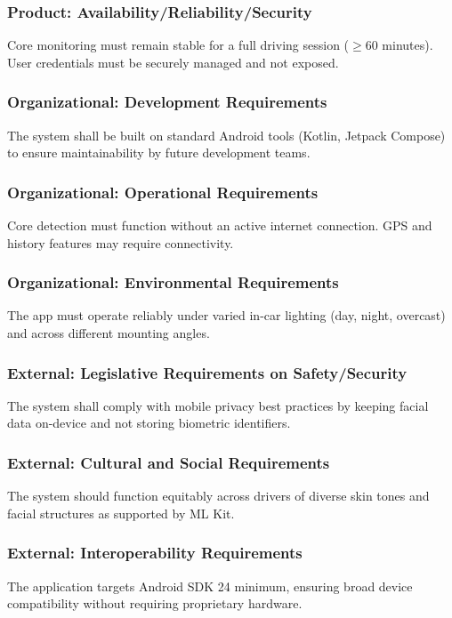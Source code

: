 \documentclass[11pt]{report}
\begin{document}
\subsubsection{Product: Availability/Reliability/Security}
Core monitoring must remain stable for a full driving session ($\geq$60 minutes). User credentials must be securely managed and not exposed.

\subsubsection{Organizational: Development Requirements}
The system shall be built on standard Android tools (Kotlin, Jetpack Compose) to ensure maintainability by future development teams.

\subsubsection{Organizational: Operational Requirements}
Core detection must function without an active internet connection. GPS and history features may require connectivity.

\subsubsection{Organizational: Environmental Requirements}
The app must operate reliably under varied in-car lighting (day, night, overcast) and across different mounting angles.

\subsubsection{External: Legislative Requirements on Safety/Security}
The system shall comply with mobile privacy best practices by keeping facial data on-device and not storing biometric identifiers.

\subsubsection{External: Cultural and Social Requirements}
The system should function equitably across drivers of diverse skin tones and facial structures as supported by ML Kit.

\subsubsection{External: Interoperability Requirements}
The application targets Android SDK 24 minimum, ensuring broad device compatibility without requiring proprietary hardware.
\end{document}
